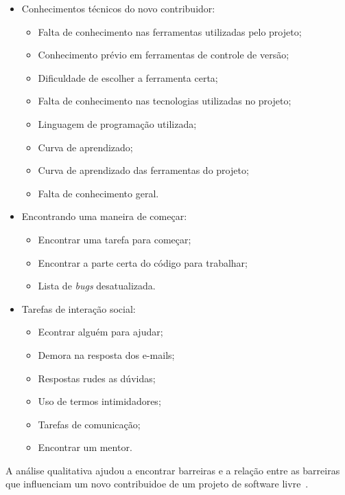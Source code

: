 \begin{itemize}
\item Conhecimentos técnicos do novo contribuidor:

	\begin{itemize}
	\item Falta de conhecimento nas ferramentas utilizadas pelo projeto;
	\item Conhecimento prévio em ferramentas de controle de versão;
	\item Dificuldade de escolher a ferramenta certa;
	\item Falta de conhecimento nas tecnologias utilizadas no projeto;
	\item Linguagem de programação utilizada;
	\item Curva de aprendizado;
	\item Curva de aprendizado das ferramentas do projeto;
	\item Falta de conhecimento geral.
	\end{itemize}

\item Encontrando uma maneira de começar:
	
	\begin{itemize}
	\item Encontrar uma tarefa para começar;
	\item Encontrar a parte certa do código para trabalhar;
	\item Lista de \textit{bugs} desatualizada.
	\end{itemize}

\item Tarefas de interação social:
	
	\begin{itemize}
	\item Econtrar alguém para ajudar;
	\item Demora na resposta dos e-mails;
	\item Respostas rudes as dúvidas;
	\item Uso de termos intimidadores;
	\item Tarefas de comunicação;
	\item Encontrar um mentor.
	\end{itemize}

\end{itemize} 

A análise qualitativa ajudou a encontrar barreiras e a relação entre as barreiras
que influenciam um novo contribuidoe de um projeto de software livre~\cite{Steinmacher:2014:HLO:2593702.2593704}.

